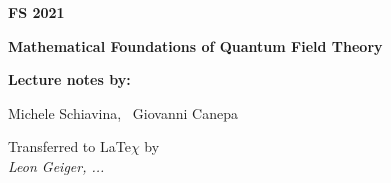 \documentclass[12pt, twoside]{article}
\begin{document}
\begin{titlepage}
   \begin{center}
       \vspace*{1cm}

       \textbf{\large FS 2021}

       \vspace{1.5cm}
       \textbf{\Huge Mathematical Foundations of Quantum Field Theory}

       \vspace{7.0cm}

       \textbf{Lecture notes by:}

       \vspace{0.3cm}

       {\large Michele Schiavina, \ Giovanni Canepa}

       \vfill

       Transferred to LaTe$\chi$ by\\
       \textit{Leon Geiger, ...}

       \vspace{0.8cm}




   \end{center}
\end{titlepage}

\newpage



\tableofcontents\thispagestyle{fancy}
\setcounter{page}{2}
\clearpage
{}
 \thispagestyle{fancy}
\end{document}
